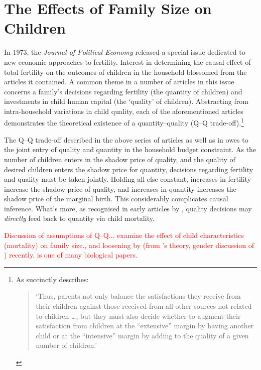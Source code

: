 \section{The Effects of Family Size on Children}
In 1973, the \emph{Journal of Political Economy} released a special issue 
dedicated to new economic approaches to fertility.  Interest in determining
the causal effect of total fertility on the outcomes of children in the 
household blossomed from the articles it contained.  A common theme in a number 
of articles in this issue \citep{BeckerLewis1973, DeTray1973, Willis1973} 
concerns a family's decisions regarding fertility (the quantity of children) 
and investments in child human capital (the `quality' of children). Abstracting 
from intra-household variations in child quality, each of the aforementioned
articles demonstrates the theoretical existence of a quantity--quality
(Q--Q trade-off).\footnote{As \citet{Willis1973} succinctly describes:
\begin{quote}
`Thus, parents not only balance the satisfactions they receive from their
children against those received from all other sources not related to 
children \ldots, but they must also decide whether to augment their 
satisfaction from children at the ``extensive'' margin by having another
child or at the ``intensive'' margin by adding to the quality of a given
number of children.'
\end{quote}
}

The Q--Q trade-off described in the above series of articles as well as in
\citet{BeckerTomes1976,BeckerTomes1986} owes to the joint entry of quality and 
quantity in the household budget constraint.  As the number of children 
enters in the shadow price of quality, and the quality of desired children 
enters the shadow price for quantity, decisions regarding fertility and quality 
must be taken jointly.  Holding all else constant, increases in fertility 
increase the shadow price of quality, and increases in quantity increases the
shadow price of the marginal birth. This considerably complicates causal 
inference. What's more, as recognised in early articles by \citet{%
BenPorathWelch1972,BenPorath1976}, quality decisions may \emph{directly} feed 
back to quantity via child mortality.

\textcolor{red}{Discussion of assumptions of Q--Q...
 examine the effect of child 
characteristics (mortality) on family size., and loosening by 
\citet{AizerCunha2012} (from \citet{Behrmanetal1982}'s theory, gender discussion 
of \citet{ButcherCase1994}) recently. \citet{Lawsonetal2012} is one of many 
biological papers.}

